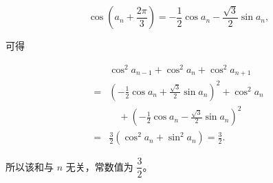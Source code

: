 \begin{answer}
\nopagebreak[4]
\[
\cos\left(a_n+\frac{2\pi}{3}\right)
=-\frac12\cos a_n-\frac{\sqrt3}{2}\sin a_n,
\]

可得

\nopagebreak[4]
\[
\begin{aligned}
&\cos^2a_{n-1}+\cos^2a_n+\cos^2a_{n+1}\\
={}&\left(-\frac12\cos a_n+\frac{\sqrt3}{2}\sin a_n\right)^2
+\cos^2a_n\\
&\quad+\left(-\frac12\cos a_n-\frac{\sqrt3}{2}\sin a_n\right)^2\\
={}&\frac32\left(\cos^2a_n+\sin^2a_n\right)
=\frac32.
\end{aligned}
\]

所以该和与 $n$ 无关，常数值为 $\dfrac32$。



\end{answer}
